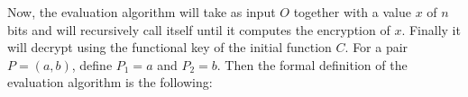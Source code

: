 Now, the evaluation algorithm will take as input $O$ together with a value $x$ of $n$ bits and will recursively call itself until it computes the encryption of $x$. Finally it will decrypt using the functional key of the initial function $C$. For a pair $P=(a,b)$, define $P_1=a$ and $P_2=b$. Then the formal definition of the evaluation algorithm is the following:
\begin{figure}[h!]
\centering
{}
\end{figure}

